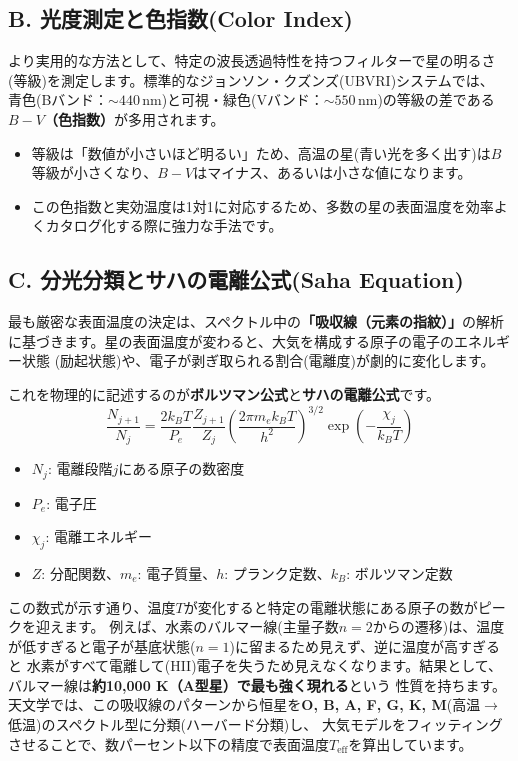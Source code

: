\documentclass[11pt,a4paper]{article}
\begin{document}
\subsection{B. 光度測定と色指数(Color Index)}
より実用的な方法として、特定の波長透過特性を持つフィルターで星の明るさ(等級)を測定します。標準的なジョンソン・クズンズ(UBVRI)システムでは、
青色(Bバンド：$\sim 440 \, \text{nm}$)と可視・緑色(Vバンド：$\sim 550 \, \text{nm}$)の等級の差である\textbf{$B-V$（色指数）}が多用されます。
\begin{itemize}
    \item 等級は「数値が小さいほど明るい」ため、高温の星(青い光を多く出す)は$B$等級が小さくなり、$B-V$はマイナス、あるいは小さな値になります。
    \item この色指数と実効温度は1対1に対応するため、多数の星の表面温度を効率よくカタログ化する際に強力な手法です。
\end{itemize}

\subsection{C. 分光分類とサハの電離公式(Saha Equation)}
最も厳密な表面温度の決定は、スペクトル中の\textbf{「吸収線（元素の指紋）」}の解析に基づきます。星の表面温度が変わると、大気を構成する原子の電子のエネルギー状態
(励起状態)や、電子が剥ぎ取られる割合(電離度)が劇的に変化します。

これを物理的に記述するのが\textbf{ボルツマン公式}と\textbf{サハの電離公式}です。
\begin{equation}
    \frac{N_{j+1}}{N_j} = \frac{2 k_B T}{P_e} \frac{Z_{j+1}}{Z_j} \left(\frac{2\pi m_e k_B T}{h^2}\right)^{3/2} \exp\left(-\frac{\chi_j}{k_B T}\right)
\end{equation}

\begin{itemize}
    \item $N_j$: 電離段階$j$にある原子の数密度
    \item $P_e$: 電子圧
    \item $\chi_j$: 電離エネルギー
    \item $Z$: 分配関数、$m_e$: 電子質量、$h$: プランク定数、$k_B$: ボルツマン定数
\end{itemize}

この数式が示す通り、温度$T$が変化すると特定の電離状態にある原子の数がピークを迎えます。
例えば、水素のバルマー線(主量子数$n=2$からの遷移)は、温度が低すぎると電子が基底状態($n=1$)に留まるため見えず、逆に温度が高すぎると
水素がすべて電離して(HII)電子を失うため見えなくなります。結果として、バルマー線は\textbf{約10,000 K（A型星）で最も強く現れる}という
性質を持ちます。
天文学では、この吸収線のパターンから恒星を\textbf{O, B, A, F, G, K, M}(高温$\rightarrow$低温)のスペクトル型に分類(ハーバード分類)し、
大気モデルをフィッティングさせることで、数パーセント以下の精度で表面温度$T_{\text{eff}}$を算出しています。
\end{document}
